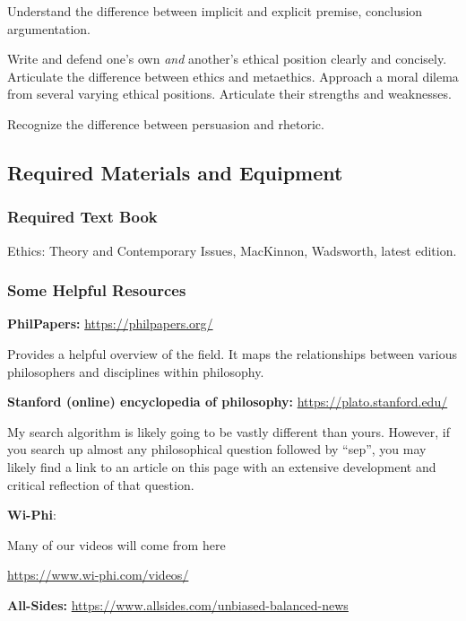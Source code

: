 \documentclass[]{tufte-handout}
\begin{document}
Understand the difference between implicit and explicit premise, conclusion argumentation.

Write and defend one's own \emph{and} another's ethical position clearly and concisely. Articulate the difference between ethics and metaethics. Approach a moral dilema from several varying ethical positions. Articulate their strengths and weaknesses.

Recognize the difference between persuasion and rhetoric.

\hypertarget{required-materials-and-equipment}{%
\subsection{Required Materials and Equipment}\label{required-materials-and-equipment}}

\hypertarget{required-text-book}{%
\subsubsection{Required Text Book}\label{required-text-book}}

Ethics: Theory and Contemporary Issues, MacKinnon, Wadsworth, latest edition.

\hypertarget{some-helpful-resources}{%
\subsubsection{Some Helpful Resources}\label{some-helpful-resources}}

\textbf{PhilPapers:} \url{https://philpapers.org/}

Provides a helpful overview of the field. It maps the relationships between various philosophers and disciplines within philosophy.

\textbf{Stanford (online) encyclopedia of philosophy:} \url{https://plato.stanford.edu/}

My search algorithm is likely going to be vastly different than yours. However, if you search up almost any philosophical question followed by ``sep'', you may likely find a link to an article on this page with an extensive development and critical reflection of that question.

\textbf{Wi-Phi}:

Many of our videos will come from here

\url{https://www.wi-phi.com/videos/}

\textbf{All-Sides:} \url{https://www.allsides.com/unbiased-balanced-news}
\end{document}
